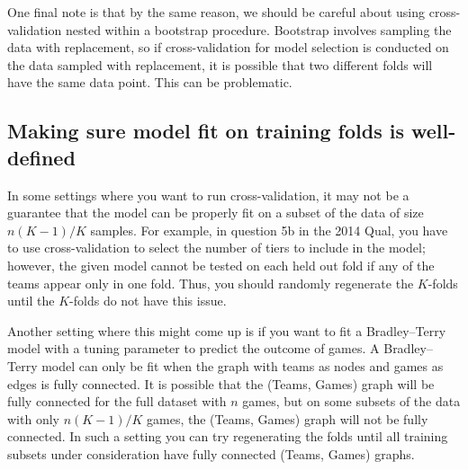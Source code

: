One final note is that by the same reason, we should be careful about using cross-validation nested within a bootstrap procedure. Bootstrap involves sampling the data with replacement, so if cross-validation for model selection is conducted on the data sampled with replacement, it is possible that two different folds will have the same data point. This can be problematic.

\subsection{Making sure model fit on training folds is well-defined}

In some settings where you want to run cross-validation, it may not be a guarantee that the model can be properly fit on a subset of the data of size $n(K-1)/K$ samples. For example, in question 5b in the 2014 Qual, you have to use cross-validation to select the number of tiers to include in the model; however, the given model cannot be tested on each held out fold if any of the teams appear only in one fold. Thus, you should randomly regenerate the $K$-folds until the $K$-folds do not have this issue. 

Another setting where this might come up is if you want to fit a Bradley--Terry model with a tuning parameter to predict the outcome of games. A Bradley--Terry model can only be fit when the graph with teams as nodes and games as edges is fully connected. It is possible that the (Teams, Games) graph will be fully connected for the full dataset with $n$ games, but on some subsets of the data with only $n(K-1)/K$ games, the  (Teams, Games) graph will not be fully connected. In such a setting you can try regenerating the folds until all training subsets under consideration have fully connected (Teams, Games) graphs. 
